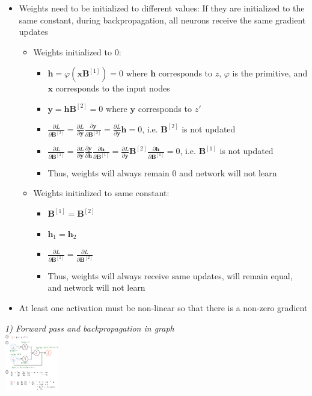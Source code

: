 \begin{itemize}
    \item Weights need to be initialized to different values: If they are initialized to the same constant, during backpropagation, all neurons receive the same gradient updates
    \begin{itemize}
        \item Weights initialized to $0$:
        \begin{itemize}
            \item $\boldsymbol{h} = \varphi\left( \boldsymbol{x} \boldsymbol{B}^{[1]}\right) = 0$ where $\boldsymbol{h}$ corresponds to $z$, $\varphi$ is the primitive, and $\boldsymbol{x}$ corresponds to the input nodes 
            \item $\boldsymbol{y} = \boldsymbol{h} \boldsymbol{B}^{[2]} = 0$ where $\boldsymbol{y}$ corresponds to $z'$
            \item $\frac{\partial L}{\partial \boldsymbol{B}^{[2]}} = \frac{\partial L}{\partial \boldsymbol{y}} \frac{\partial \boldsymbol{y}}{\partial \boldsymbol{B}^{[2]}} = \frac{\partial L}{\partial \boldsymbol{y}} \boldsymbol{h} = 0$, i.e. $\boldsymbol{B}^{[2]}$ is not updated
            \item $\frac{\partial L}{\partial \boldsymbol{B}^{[1]}} = \frac{\partial L}{\partial \boldsymbol{y}} \frac{\partial \boldsymbol{y}}{\partial \boldsymbol{h}} \frac{\partial \boldsymbol{h}}{\partial \boldsymbol{B}^{[1]}} = \frac{\partial L}{\partial \boldsymbol{y}} \boldsymbol{B}^{[2]} \frac{\partial \boldsymbol{h}}{\partial \boldsymbol{B}^{[1]}} = 0$, i.e. $\boldsymbol{B}^{[1]}$ is not updated
            \item Thus, weights will always remain $0$ and network will not learn
        \end{itemize}
        \item Weights initialized to same constant:
        \begin{itemize}
            \item $\boldsymbol{B}^{[1]} = \boldsymbol{B}^{[2]}$
            \item $\boldsymbol{h}_1 = \boldsymbol{h}_2$
            \item $\frac{\partial L}{\partial \boldsymbol{B}^{[1]}} = \frac{\partial L}{\partial \boldsymbol{B}^{[2]}}$
            \item Thus, weights will always receive same updates, will remain equal, and network will not learn
        \end{itemize}
    \end{itemize}
    \item At least one activation must be non-linear so that there is a non-zero gradient
\end{itemize}

\begin{multicols}{2}
\textit{1) Forward pass and backpropagation in graph}\\
\includegraphics[height=25mm]{inhalt/images/NLP/05_backpropagation_1.png}
\end{multicols}